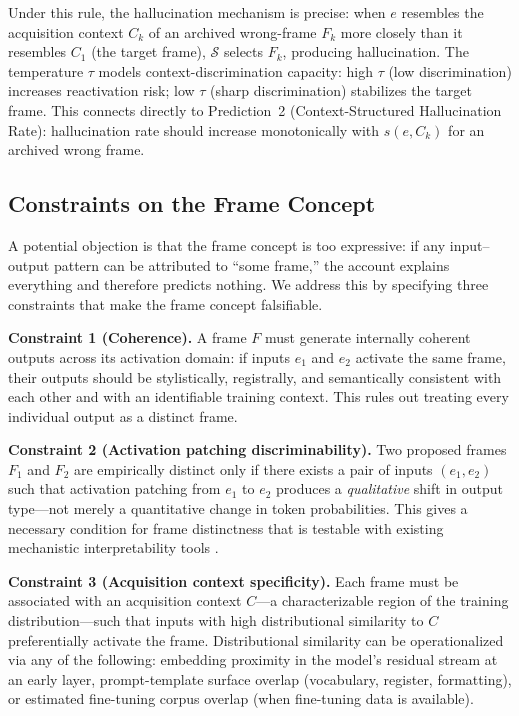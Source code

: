 \documentclass[12pt]{article}
\begin{document}
\noindent
Under this rule, the hallucination mechanism is precise:
when $e$ resembles the acquisition context $C_k$ of an archived
wrong-frame $F_k$ more closely than it resembles $C_1$ (the target
frame), $\mathcal{S}$ selects $F_k$, producing hallucination.
The temperature $\tau$ models context-discrimination capacity:
high $\tau$ (low discrimination) increases reactivation risk;
low $\tau$ (sharp discrimination) stabilizes the target frame.
This connects directly to Prediction~2 (Context-Structured
Hallucination Rate): hallucination rate should increase
monotonically with $s(e, C_k)$ for an archived wrong frame.

\subsection{Constraints on the Frame Concept}
\label{sec:frame-constraints}

A potential objection is that the frame concept is too expressive:
if any input--output pattern can be attributed to ``some frame,''
the account explains everything and therefore predicts nothing.
We address this by specifying three constraints that make the frame
concept falsifiable.

\textbf{Constraint 1 (Coherence).}
A frame $F$ must generate internally coherent outputs across its
activation domain: if inputs $e_1$ and $e_2$ activate the same
frame, their outputs should be stylistically, registrally, and
semantically consistent with each other and with an identifiable
training context.
This rules out treating every individual output as a distinct frame.

\textbf{Constraint 2 (Activation patching discriminability).}
Two proposed frames $F_1$ and $F_2$ are empirically distinct only
if there exists a pair of inputs $(e_1, e_2)$ such that activation
patching from $e_1$ to $e_2$ produces a \emph{qualitative} shift
in output type---not merely a quantitative change in token
probabilities.
This gives a necessary condition for frame distinctness that is
testable with existing mechanistic interpretability tools
\cite{conmy2023towards}.

\textbf{Constraint 3 (Acquisition context specificity).}
Each frame must be associated with an acquisition context $C$---a
characterizable region of the training distribution---such that
inputs with high distributional similarity to $C$ preferentially
activate the frame.
Distributional similarity can be operationalized via any of the
following: embedding proximity in the model's residual stream
at an early layer, prompt-template surface overlap (vocabulary,
register, formatting), or estimated fine-tuning corpus overlap
(when fine-tuning data is available).
\end{document}
